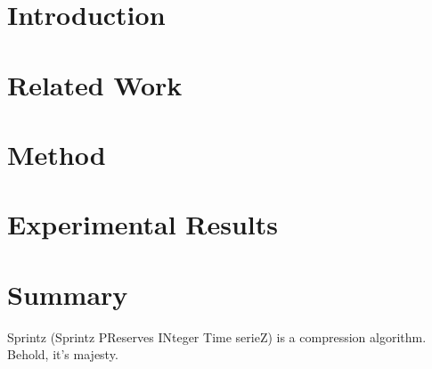 \documentclass[sigconf]{acmart}  %
\begin{document}
\section{Introduction} \label{sec:intro}




% 

\section{Related Work} \label{sec:relatedWork}



\section{Method} \label{sec:method}



\section{Experimental Results} \label{sec:results}



\vspace{-1mm}
\section{Summary} \label{sec:conclusion}

Sprintz (Sprintz PReserves INteger Time serieZ) is a compression algorithm. Behold, it's majesty.

\vspace{-1mm}



% 

\end{document}
